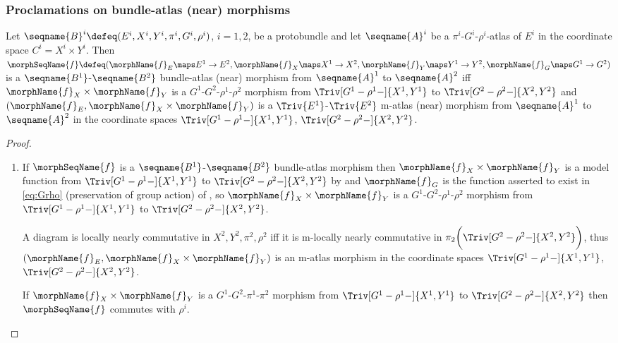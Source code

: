 \documentclass{article}
\begin{document}
\subsubsection{Proclamations on bundle-atlas (near) morphisms}
\begin{lemma}
\label{lem:Bun-ATLmorph}
Let
$
  \seqname{B}^i
  \defeq
  (
    E^i,
    X^i,
    Y^i,
    \pi^i,
    G^i,
    \rho^i
  )
$, $i=1,2$, be a protobundle and let
$\seqname{A}^i$ be a $\pi^i$-$G^i$-$\rho^i$-atlas of $E^i$ in the coordinate space
\nobreaks
{{
  $C^i = X^i \times Y^i$.
}}
Then
$
  \morphSeqName{f}
  \defeq
  (
    \morphName{f}_E \maps E^1 \to E^2,
    \morphName{f}_X \maps X^1 \to X^2,
    \morphName{f}_Y \maps Y^1 \to Y^2,
    \morphName{f}_G \maps G^1 \to G^2
  )
$
is a $\seqname{B^1}$-$\seqname{B^2}$ bundle-atlas (near) morphism from
$\seqname{A}^1$ to $\seqname{A}^2$ iff
$\morphName{f}_X \times \morphName{f}_Y$ is a
$G^1$-$G^2$-$\rho^1$-$\rho^2$ morphism from
$\Triv[G^1-\rho^1-]{X^1,Y^1}$ to $\Triv[G^2-\rho^2-]{X^2,Y^2}$ and
$(\morphName{f}_E, \morphName{f}_X \times \morphName{f}_Y)$ is a
$\Triv{E^1}$-$\Triv{E^2}$ m-atlas (near) morphism from $\seqname{A}^1$
to $\seqname{A}^2$ in the coordinate spaces
$\Triv[G^1-\rho^1-]{X^1,Y^1}$, $\Triv[G^2-\rho^2-]{X^2,Y^2}$.

\begin{proof}
\leavevmode
\begin{enumerate}
\item
If $\morphSeqName{f}$ is a $\seqname{B^1}$-$\seqname{B^2}$ bundle-atlas
morphism then $\morphName{f}_X \times \morphName{f}_Y$ is a model function
from $\Triv[G^1-\rho^1-]{X^1,Y^1}$ to $\Triv[G^2-\rho^2-]{X^2,Y^2}$
by 
and $\morphName{f}_G$ is the function asserted to exist in
{
  \showlabelsinline
  \cref{eq:Grho}
}
(preservation of group action) of ,
so $\morphName{f}_X \times \morphName{f}_Y$ is a
$G^1$-$G^2$-$\rho^1$-$\rho^2$ morphism from
$\Triv[G^1-\rho^1-]{X^1,Y^1}$ to $\Triv[G^2-\rho^2-]{X^2,Y^2}$.

A diagram is locally nearly commutative in $X^2,Y^2,\pi^2,\rho^2$ iff it
is m-locally nearly commutative in
$\pi_2 \biggl ( \Triv[G^2-\rho^2-]{X^2,Y^2} \biggr )$,
thus $(\morphName{f}_E, \morphName{f}_X \times \morphName{f}_Y)$ is an
m-atlas morphism in the coordinate spaces $\Triv[G^1-\rho^1-]{X^1,Y^1}$,
$\Triv[G^2-\rho^2-]{X^2,Y^2}$.

If $\morphName{f}_X \times \morphName{f}_Y$ is a
$G^1$-$G^2$-$\pi^1$-$\pi^2$ morphism from $\Triv[G^1-\rho^1-]{X^1,Y^1}$
to $\Triv[G^2-\rho^2-]{X^2,Y^2}$ then $\morphSeqName{f}$ commutes with
$\rho^i$.


\end{enumerate}
\end{proof}
\end{lemma}
\end{document}
